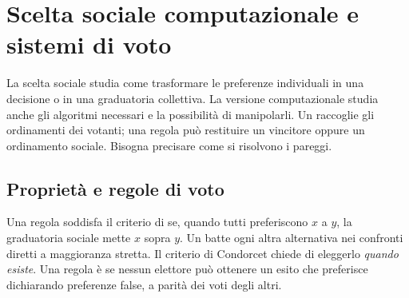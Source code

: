 \chapter[Scelta sociale computazionale]{Scelta sociale computazionale e sistemi di voto}
\parteteoria
La scelta sociale studia come trasformare le preferenze individuali in una decisione o in una graduatoria collettiva. La versione computazionale studia anche gli algoritmi necessari e la possibilità di manipolarli. Un  raccoglie gli ordinamenti dei votanti; una regola può restituire un vincitore oppure un ordinamento sociale. Bisogna precisare come si risolvono i pareggi.

\section{Proprietà e regole di voto}
Una regola soddisfa il criterio di  se, quando tutti preferiscono $x$ a $y$, la graduatoria sociale mette $x$ sopra $y$. Un  batte ogni altra alternativa nei confronti diretti a maggioranza stretta. Il criterio di Condorcet chiede di eleggerlo \emph{quando esiste}. Una regola è  se nessun elettore può ottenere un esito che preferisce dichiarando preferenze false, a parità dei voti degli altri.


